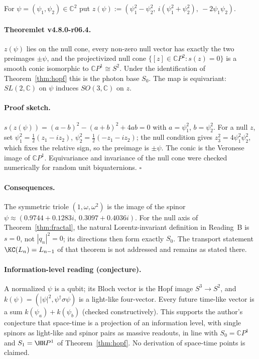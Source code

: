 For \(\psi=(\psi_1,\psi_2)\in\mathbb C^2\) put
\(z(\psi):=(\psi_1^2-\psi_2^2,\ i(\psi_1^2+\psi_2^2),\ -2\psi_1\psi_2)\).

\paragraph{Theoremlet v4.8.0-r06.4.}
\(z(\psi)\) lies on the null cone, every non-zero null vector has exactly the two preimages
\(\pm\psi\), and the projectivized null cone \(\{[z]\in\mathbb CP^2:s(z)=0\}\) is a smooth conic
isomorphic to \(\mathbb CP^1\cong S^2\).  Under the identification of Theorem~\ref{thm:hopf} this is
the photon base \(S_0\).  The map is equivariant: \(SL(2,\mathbb C)\) on \(\psi\) induces
\(SO(3,\mathbb C)\) on \(z\).

\paragraph{Proof sketch.}
\(s(z(\psi))=(a-b)^2-(a+b)^2+4ab=0\) with \(a=\psi_1^2\), \(b=\psi_2^2\).  For a null \(z\), set
\(\psi_1^2=\tfrac12(z_1-iz_2)\), \(\psi_2^2=\tfrac12(-z_1-iz_2)\); the null condition gives
\(z_3^2=4\psi_1^2\psi_2^2\), which fixes the relative sign, so the preimage is \(\pm\psi\).  The
conic is the Veronese image of \(\mathbb CP^1\).  Equivariance and invariance of the null cone
were checked numerically for random unit biquaternions.  \(\square\)

\paragraph{Consequences.}
The symmetric triole \((1,\omega,\omega^2)\) is the image of the spinor
\(\psi\approx(0.9744+0.1283i,\ 0.3097+0.4036i)\).  For the null axis of
Theorem~\ref{thm:fractal}, the natural Lorentz-invariant definition in Reading~B is \(s=0\), not
\(|q_n|^2=0\); its directions then form exactly \(S_0\).  The transport statement
\(\KC(L_n)=L_{n-1}\) of that theorem is not addressed and remains as stated there.

\paragraph{Information-level reading (conjecture).}
A normalized \(\psi\) is a qubit; its Bloch vector is the Hopf image \(S^3\to S^2\), and
\(k(\psi)=(|\psi|^2,\psi^\dagger\sigma\psi)\) is a light-like four-vector.  Every future time-like
vector is a sum \(k(\psi_a)+k(\psi_b)\) (checked constructively).  This supports the author's
conjecture that space-time is a projection of an information level, with single spinors as
light-like and spinor pairs as massive readouts, in line with
\(S_0=\mathbb CP^1\) and \(S_1=\HH P^1\) of Theorem~\ref{thm:hopf}.  No derivation of space-time
points is claimed.

